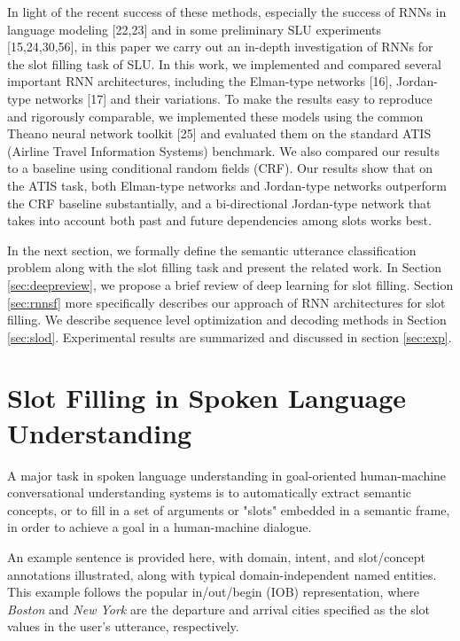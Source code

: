 In light of the recent success of these methods, especially the success of RNNs
in language modeling [22,23] and in some preliminary SLU experiments
[15,24,30,56], in this paper we carry out an in-depth investigation of RNNs for
the slot filling task of SLU. In this work, we implemented and compared several
important RNN architectures, including the Elman-type networks [16],
Jordan-type networks [17] and their variations. To make the results easy to
reproduce and rigorously comparable, we implemented these models using the
common Theano neural network toolkit [25] and evaluated them on the standard
ATIS (Airline Travel Information Systems) benchmark. We also compared our
results to a baseline using conditional random fields (CRF). Our results show
that on the ATIS task, both Elman-type networks and Jordan-type networks
outperform the CRF baseline substantially, and a bi-directional Jordan-type
network that takes into account both past and future dependencies among slots
works best.

In the next section, we formally define the semantic utterance
classification problem along with the slot filling task and present the
related work. In Section \ref{sec:deepreview}, we propose a brief review of deep learning
for slot filling. Section \ref{sec:rnnsf} more specifically describes our approach of
RNN architectures for slot filling. We describe sequence level
optimization and decoding methods in Section \ref{sec:slod}. Experimental results
are summarized and discussed in section \ref{sec:exp}.

\section{Slot Filling in Spoken Language Understanding}
\label{sec:sfslu}

A major task in spoken language understanding in goal-oriented human-machine
conversational understanding systems is to automatically extract semantic
concepts, or to fill in a set of arguments or "slots" embedded in a semantic
frame, in order to achieve a goal in a human-machine dialogue. 

An example sentence is provided here, with domain, intent, and slot/concept
annotations illustrated, along with typical domain-independent named entities.
This example follows the popular in/out/begin (IOB) representation, where {\it
Boston} and {\it New York} are the departure and arrival cities specified as
the slot values in the user's utterance, respectively.

